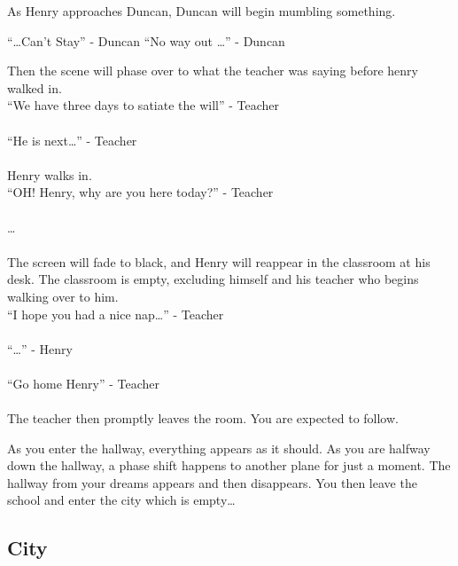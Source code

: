 \documentclass[12pt, a4paper, titlepage]{article}
\begin{document}
            As Henry approaches Duncan, Duncan will begin mumbling something.
            
            ``\ldots Can't Stay''  - Duncan
            ``No way out \ldots'' - Duncan
            
            Then the scene will phase over to what the teacher was saying before henry walked in.\\
            
           ``We have three days to satiate the will'' - Teacher\\~\\
           ``He is next\ldots'' - Teacher\\~\\
           
           Henry walks in.\\
 
           ``OH! Henry, why are you here today?'' - Teacher\\~\\
           \ldots\\~\\
           
           The screen will fade to black, and Henry will reappear in the classroom at his desk. The classroom is empty, 
           excluding himself and his teacher who begins walking over to him.\\
           
           ``I hope you had a nice nap\ldots'' - Teacher\\~\\
           ``\ldots'' - Henry\\~\\
           ``Go home Henry'' - Teacher\\~\\
           
           The teacher then promptly leaves the room. You are expected to follow.
           
           As you enter the hallway, everything appears as it should. As you are halfway down the hallway, a phase shift happens to another plane for just a moment. The hallway from your 		dreams appears and then disappears. You then leave the school and enter the city which is empty\ldots
           
        \subsection{City}
        
\end{document}
